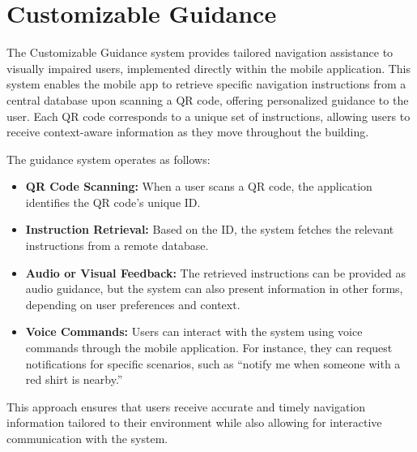\section{Customizable Guidance}

The Customizable Guidance system provides tailored navigation assistance to visually impaired users, implemented directly within the mobile application. This system enables the mobile app to retrieve specific navigation instructions from a central database upon scanning a QR code, offering personalized guidance to the user. Each QR code corresponds to a unique set of instructions, allowing users to receive context-aware information as they move throughout the building.

The guidance system operates as follows:
\begin{itemize}
	\item \textbf{QR Code Scanning:} When a user scans a QR code, the application identifies the QR code's unique ID.
	\item \textbf{Instruction Retrieval:} Based on the ID, the system fetches the relevant instructions from a remote database.
	\item \textbf{Audio or Visual Feedback:} The retrieved instructions can be provided as audio guidance, but the system can also present information in other forms, depending on user preferences and context.
	\item \textbf{Voice Commands:} Users can interact with the system using voice commands through the mobile application. For instance, they can request notifications for specific scenarios, such as “notify me when someone with a red shirt is nearby.”
\end{itemize}

This approach ensures that users receive accurate and timely navigation information tailored to their environment while also allowing for interactive communication with the system.